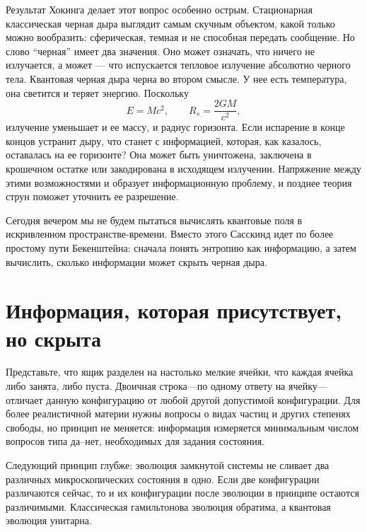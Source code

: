 Результат Хокинга делает этот вопрос особенно острым. Стационарная классическая черная дыра выглядит самым скучным объектом, какой только можно вообразить: сферическая, темная и не способная передать сообщение. Но слово ``черная'' имеет два значения. Оно может означать, что ничего не излучается, а может — что испускается тепловое излучение абсолютно черного тела. Квантовая черная дыра черна во втором смысле. У нее есть температура, она светится и теряет энергию. Поскольку
\begin{equation}
E=Mc^2,
\qquad
R_s=\frac{2GM}{c^2},
\end{equation}
излучение уменьшает и ее массу, и радиус горизонта. Если испарение в конце концов устранит дыру, что станет с информацией, которая, как казалось, оставалась на ее горизонте? Она может быть уничтожена, заключена в крошечном остатке или закодирована в исходящем излучении. Напряжение между этими возможностями и образует информационную проблему, и позднее теория струн поможет уточнить ее разрешение.

Сегодня вечером мы не будем пытаться вычислять квантовые поля в искривленном пространстве-времени. Вместо этого Сасскинд идет по более простому пути Бекенштейна: сначала понять энтропию как информацию, а затем вычислить, сколько информации может скрыть черная дыра.

\section{Информация, которая присутствует, но скрыта}

Представьте, что ящик разделен на настолько мелкие ячейки, что каждая ячейка либо занята, либо пуста. Двоичная строка---по одному ответу на ячейку---отличает данную конфигурацию от любой другой допустимой конфигурации. Для более реалистичной материи нужны вопросы о видах частиц и других степенях свободы, но принцип не меняется: информация измеряется минимальным числом вопросов типа да--нет, необходимых для задания состояния.

\begin{classroomqa}
\end{classroomqa}

Следующий принцип глубже: эволюция замкнутой системы не сливает два различных микроскопических состояния в одно. Если две конфигурации различаются сейчас, то и их конфигурации после эволюции в принципе остаются различимыми. Классическая гамильтонова эволюция обратима, а квантовая эволюция унитарна.

